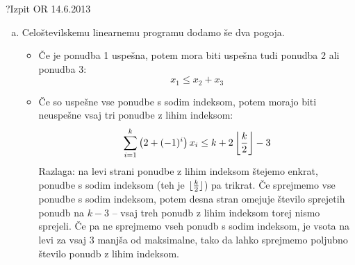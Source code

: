 \begin{naloga}{?}{Izpit OR 14.6.2013}
\begin{odgovor}
\begin{enumerate}[(a)]
\item Celoštevilskemu linearnemu programu dodamo še dva pogoja.
    \begin{itemize}
    \item Če je ponudba 1 uspešna,
    potem mora biti uspešna tudi ponudba 2 ali ponudba 3:
    $$
    x_1 \le x_2 + x_3
    $$
    \item Če so uspešne vse ponudbe s sodim indeksom,
    potem morajo biti ne\-uspeš\-ne vsaj tri ponudbe z lihim indeksom:
    $$
    \sum_{i=1}^{k} \left(2 + (-1)^i\right) x_{i}
    \le k + 2 \left\lfloor {k \over 2} \right\rfloor - 3
    $$
    Razlaga: na levi strani ponudbe z lihim indeksom štejemo enkrat,
    ponudbe s sodim indeksom
    (teh je $\lfloor {k \over 2} \rfloor$)
    pa trikrat.
    Če sprejmemo vse ponudbe s sodim indeksom,
    potem desna stran omejuje število sprejetih ponudb na $k - 3$
    -- vsaj treh ponudb z lihim indeksom torej nismo sprejeli.
    Če pa ne sprejmemo vseh ponudb s sodim indeksom,
    je vsota na levi za vsaj $3$ manjša od maksimalne,
    tako da lahko sprejmemo poljubno število ponudb z lihim indeksom.
    \end{itemize}
\end{enumerate}
\end{odgovor}
\end{naloga}
